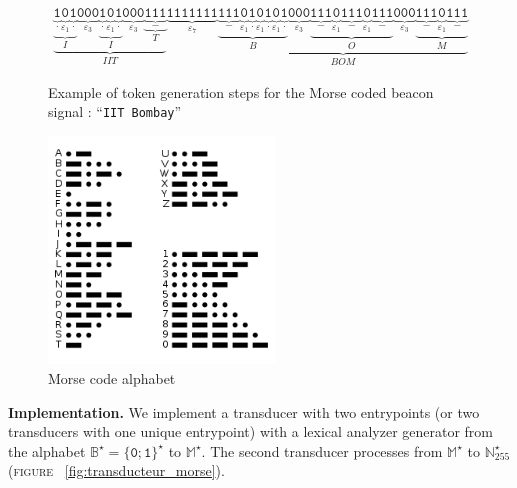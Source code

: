 \documentclass[a4paper]{report}
\begin{document}
\begin{figure}[]
  \begin{eqnarray*}
    \underbrace{\underbrace{\underbrace{\texttt{1}}_{.} \underbrace{\texttt{0}}_{\varepsilon_1} \underbrace{\texttt{1}}_{.}}_{I} \underbrace{\texttt{000}}_{\varepsilon_3} \underbrace{\underbrace{\texttt{1}}_{.} \underbrace{\texttt{0}}_{\varepsilon_1} \underbrace{\texttt{1}}_{.}}_{I} \underbrace{\texttt{000}}_{\varepsilon_3} \underbrace{\underbrace{\texttt{111}}_{-}}_{T}}_{IIT}
    \underbrace{\texttt{1111111}}_{\varepsilon_7}
    \underbrace{\underbrace{\underbrace{\texttt{111}}_{-} \underbrace{\texttt{0}}_{\varepsilon_1} \underbrace{\texttt{1}}_{.} \underbrace{\texttt{0}}_{\varepsilon_1} \underbrace{\texttt{1}}_{.} \underbrace{\texttt{0}}_{\varepsilon_1} \underbrace{\texttt{1}}_{.}}_{B} \underbrace{\texttt{000}}_{\varepsilon_3} \underbrace{\underbrace{\texttt{111}}_{-} \underbrace{\texttt{0}}_{\varepsilon_1} \underbrace{\texttt{111}}_{-} \underbrace{\texttt{0}}_{\varepsilon_1} \underbrace{\texttt{111}}_{-}}_{O} \underbrace{\texttt{000}}_{\varepsilon_3} \underbrace{\underbrace{\texttt{111}}_{-} \underbrace{\texttt{0}}_{\varepsilon_1} \underbrace{\texttt{111}}_{-}}_{M}}_{BOM}
  \end{eqnarray*}  
  \caption{Example of token generation steps for the Morse coded beacon signal : ``\texttt{IIT Bombay}''}
  \label{fig:exemple_signal_morse}
\end{figure}


\begin{figure}[h]
  \includegraphics[width=6cm]{pictures/morse.png}
\caption{Morse code alphabet}
\label{fig:morse}
\end{figure}

\textbf{Implementation.} We implement a transducer with two entrypoints (or two transducers with one unique entrypoint) with a lexical analyzer generator from the alphabet $\mathbb{B}^{\star} = \{ \texttt{0} ; \texttt{1} \}^{\star}$ to $\mathbb{M}^{\star}$. The second transducer processes from $\mathbb{M}^{\star}$ to $\mathbb{N}_{255}^{\star}$ (\textsc{figure} ~\ref{fig:transducteur_morse}).
\end{document}
